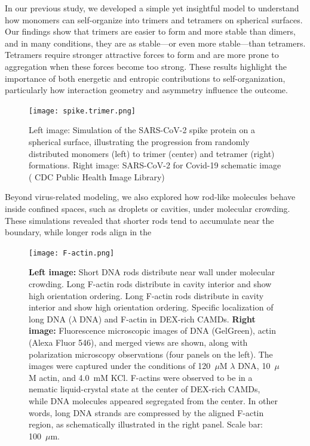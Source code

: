 \documentclass[12pt]{article}
\begin{document}
\begin{flushleft}
In our previous study, we developed a simple yet insightful model to understand how monomers can self-organize into trimers and tetramers on spherical surfaces. Our findings show that trimers are easier to form and more stable than dimers, and in many conditions, they are as stable—or even more stable—than tetramers. Tetramers require stronger attractive forces to form and are more prone to aggregation when these forces become too strong. These results highlight the importance of both energetic and entropic contributions to self-organization, particularly how interaction geometry and asymmetry influence the outcome.



\begin{figure}[!ht]
  \centering
  \texttt{[image: spike.trimer.png]}
  \caption{Left image: Simulation of the SARS-CoV-2 spike protein on a spherical surface, illustrating the progression from randomly distributed monomers (left) to trimer (center) and tetramer (right) formations. Right image: SARS-CoV-2 for Covid-19 schematic image ( CDC Public
Health Image Library) \cite{cdc-covid}}
\end{figure}





Beyond virus-related modeling, we also explored how rod-like molecules behave inside confined spaces, such as droplets or cavities, under molecular crowding. These simulations revealed that shorter rods tend to accumulate near the boundary, while longer rods align in the 
\begin{figure}[!ht]
  \centering
   \texttt{[image: F-actin.png]}
 
  \caption{\textbf{Left image:} Short DNA rods distribute near wall under molecular crowding. Long F-actin rods distribute in cavity interior and show high orientation ordering. Long F-actin rods distribute in cavity interior and show high orientation ordering.  Specific localization of 
  long DNA ($\lambda$ DNA) and F-actin in DEX-rich CAMDs.    
       \textbf{Right image:} Fluorescence microscopic images of DNA (GelGreen), actin (Alexa Fluor 546), and merged views are shown, along with polarization microscopy observations (four panels on the left). 
        The images were captured under the conditions of 120~$\mu$M $\lambda$ DNA, 10~$\mu$M actin, and 4.0~mM KCl. 
        F-actins were observed to be in a nematic liquid-crystal state at the center of DEX-rich CAMDs, while DNA molecules appeared segregated from the center. 
        In other words, long DNA strands are compressed by the aligned F-actin region, as schematically illustrated in the right panel. 
        Scale bar: 100~$\mu$m.\cite {nakatani2018}}
\end{figure}




\end{flushleft}
\end{document}
